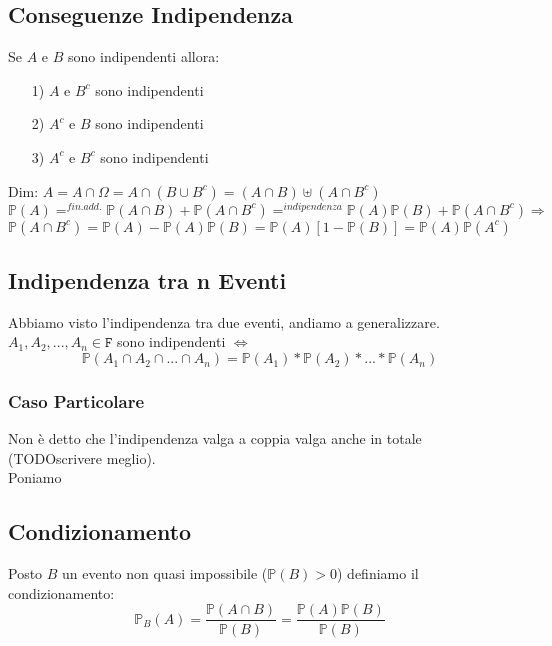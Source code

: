 \subsection{Conseguenze Indipendenza}
Se $A$ e $B$ sono indipendenti allora:
\begin{itemize}
\item[1)] $A$ e $B^c$ sono indipendenti
\item[2)] $A^c$ e $B$ sono indipendenti
\item[3)] $A^c$ e $B^c$ sono indipendenti
\end{itemize}
Dim:
$A = A \cap \Omega = A \cap (B \cup B^c) = (A \cap B) \uplus (A \cap B^c)$
$$ \mathbb{P}(A) =^{fin. add.} \mathbb{P}(A \cap B)+\mathbb{P}(A \cap B^c) =^{indipendenza} \mathbb{P}(A)\mathbb{P}(B) + \mathbb{P}(A \cap B^c) \Rightarrow$$ 
$$\mathbb{P}(A \cap B^c) = \mathbb{P}(A)-\mathbb{P}(A)\mathbb{P}(B) = \mathbb{P}(A)[1-\mathbb{P}(B)] = \mathbb{P}(A)\mathbb{P}(A^c)  $$

\subsection{Indipendenza tra n Eventi}
Abbiamo visto l'indipendenza tra due eventi, andiamo a generalizzare.\\
$A_1,A_2,...,A_n \in \mathtt{F}$ sono indipendenti $\Leftrightarrow$
$$ \mathbb{P}(A_1 \cap A_2 \cap ... \cap A_n) = \mathbb{P}(A_1)*\mathbb{P}(A_2)*...*\mathbb{P}(A_n) $$

\subsubsection{Caso Particolare}
Non è detto che l'indipendenza valga a coppia valga anche in totale (TODOscrivere meglio).\\
Poniamo 

\subsection{Condizionamento}
Posto $B$ un evento non quasi impossibile ($\mathbb{P}(B) >0$) definiamo il condizionamento:
$$ \mathbb{P}_B(A) = \frac{\mathbb{P}(A \cap B)}{\mathbb{P}(B)} = \frac{\mathbb{P}(A)\mathbb{P}(B)}{\mathbb{P}(B)} $$




